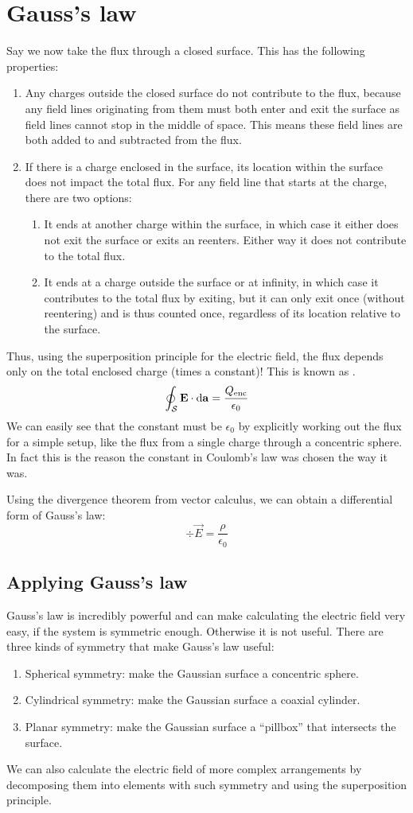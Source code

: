 \section{Gauss's law}
Say we now take the flux through a closed surface. This has the following properties:
\begin{enumerate}
\item Any charges outside the closed surface do not contribute to the flux, because any field lines originating from them must both enter and exit the surface as field lines cannot stop in the middle of space. This means these field lines are both added to and subtracted from the flux.
\item  If there is a charge enclosed in the surface, its location within the surface does not impact the total flux. For any field line that starts at the charge, there are two options:
\begin{enumerate}
\item It ends at another charge within the surface, in which case it either does not exit the surface or exits an reenters. Either way it does not contribute to the total flux.
\item It ends at a charge outside the surface or at infinity, in which case it contributes to the total flux by exiting, but it can only exit once (without reentering) and is thus counted once, regardless of its location relative to the surface.
\end{enumerate}
\end{enumerate} Thus, using the superposition principle for the electric field, the flux depends only on the total enclosed charge (times a constant)! This is known as .
\[  \oint_\mathcal{S} \bm{\mathrm{E}}\cdot \operatorname{d \!}{\bm{\mathrm{a}}} = \frac{Q_\text{enc}}{\epsilon_0} \]
We can easily see that the constant must be $\epsilon_0$ by explicitly working out the flux for a simple setup, like the flux from a single charge through a concentric sphere. In fact this is the reason the constant in Coulomb's law was chosen the way it was.

Using the divergence theorem from vector calculus, we can obtain a differential form of Gauss's law:
\[ \div \vec{E} = \frac{\rho}{\epsilon_0} \]

\subsection{Applying Gauss's law}
Gauss's law is incredibly powerful and can make calculating the electric field very easy, if the system is symmetric enough. Otherwise it is not useful. There are three kinds of symmetry that make Gauss's law useful:
\begin{enumerate}
\item Spherical symmetry: make the Gaussian surface a concentric sphere.
\item Cylindrical symmetry: make the Gaussian surface a coaxial cylinder.
\item Planar symmetry: make the Gaussian surface a ``pillbox'' that intersects the surface.
\end{enumerate}
We can also calculate the electric field of more complex arrangements by decomposing them into elements with such symmetry and using the superposition principle.

